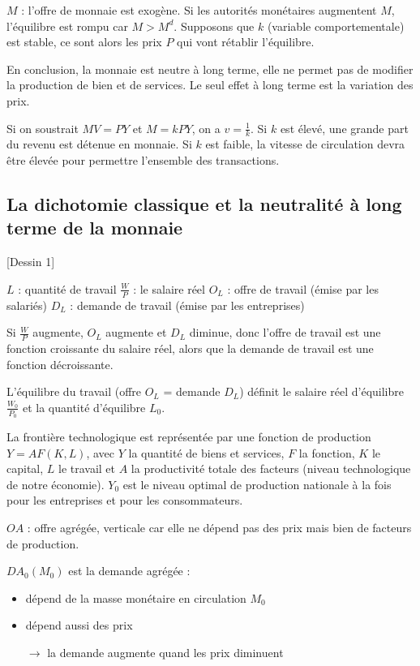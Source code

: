 	$M$ : l'offre de monnaie est exogène. Si les autorités monétaires augmentent $M$, l'équilibre est rompu car $M > M^d$. Supposons que $k$ (variable comportementale) est stable, ce sont alors les prix $P$ qui vont rétablir l'équilibre.
	
	En conclusion, la monnaie est neutre à long terme, elle ne permet pas de modifier la production de bien et de services. Le seul effet à long terme est la variation des prix.
	
	Si on soustrait $MV = PY$ et $M = kPY$, on a $v = \frac{1}{k}$. Si $k$ est élevé, une grande part du revenu est détenue en monnaie. Si $k$ est faible, la  vitesse de circulation devra être élevée pour permettre l'ensemble des transactions.
	
	\subsection{La dichotomie classique et la neutralité à long terme de la monnaie}
	
	[Dessin 1]
	
	$L$ : quantité de travail
	$\frac{W}{P}$ : le salaire réel
	$O_L$ : offre de travail (émise par les salariés)
	$D_L$ : demande de travail (émise par les entreprises)
	
	Si $\frac{W}{P}$ augmente, $O_L$ augmente et $D_L$ diminue, donc l'offre de travail est une fonction croissante du salaire réel, alors que la demande de travail est une fonction décroissante.
	
	L'équilibre du travail (offre $O_L$ = demande $D_L$) définit le salaire réel d'équilibre $\frac{W_0}{P_0}$ et la quantité d'équilibre $L_0$.
	
	La frontière technologique est représentée par une fonction de production $Y = A F(K, L)$, avec $Y$ la quantité de biens et services, $F$ la fonction, $K$ le capital, $L$ le travail et $A$ la productivité totale des facteurs (niveau technologique de notre économie). $Y_0$ est le niveau optimal de production nationale à la fois pour les entreprises et pour les consommateurs.                                                                                                                                                                            
	
	$OA$ : offre agrégée, verticale car elle ne dépend pas des prix mais bien de facteurs de production.
	
	$DA_0(M_0)$ est la demande agrégée :
	
	\begin{itemize}
		\item dépend de la masse monétaire en circulation $M_0$
		\item dépend aussi des prix
		\item[$\rightarrow$] la demande augmente quand les prix diminuent
	\end{itemize}
	
